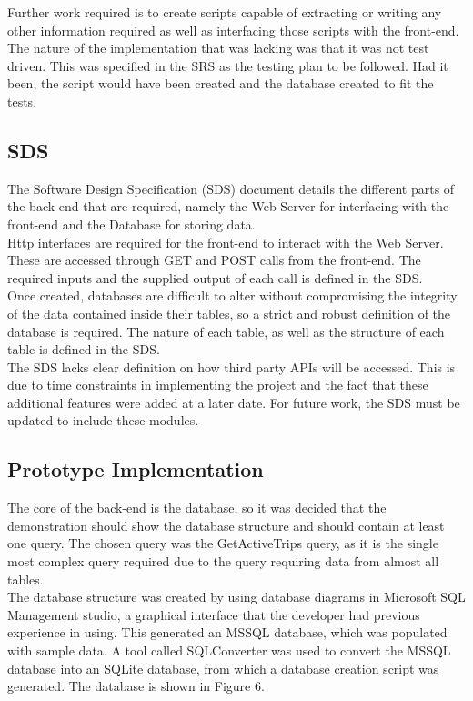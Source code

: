 \documentclass[12pt]{article}
\begin{document}
Further work required is to create scripts capable of extracting or writing any other information required as well as interfacing those scripts with the front-end.\\

The nature of the implementation that was lacking was that it was not test driven. This was specified in the SRS as the testing plan to be followed. Had it been, the script would have been created and the database created to fit the tests.
\subsection{SDS}
The Software Design Specification (SDS) document details the different parts of the back-end that are required, namely the Web Server for interfacing with the front-end and the Database for storing data. \\

Http interfaces are required for the front-end to interact with the Web Server. These are accessed through GET and POST calls from the front-end. The required inputs and the supplied output of each call is defined in the SDS. \\

Once created, databases are difficult to alter without compromising the integrity of the data contained inside their tables, so a strict and robust definition of the database is required. The nature of each table, as well as the structure of each table is defined in the SDS. \\

The SDS lacks clear definition on how third party APIs will be accessed. This is due to time constraints in implementing the project and the fact that these additional features were added at a later date. For future work, the SDS must be updated to include these modules.
\subsection{Prototype Implementation}
The core of the back-end is the database, so it was decided that the demonstration should show the database structure and should contain at least one query. The chosen query was the GetActiveTrips query, as it is the single most complex query required due to the query requiring data from almost all tables.\\

The database structure was created by using database diagrams in Microsoft SQL Management studio, a graphical interface that the developer had previous experience in using. This generated an MSSQL database, which was populated with sample data. A tool called SQLConverter was used to convert the MSSQL database into an SQLite database, from which a database creation script was generated. The database is shown in Figure 6.\\
\end{document}
